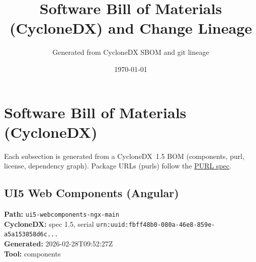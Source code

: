 \documentclass[11pt,a4paper]{article}
\title{\textbf{Software Bill of Materials (CycloneDX) and Change Lineage}}
\author{Generated from CycloneDX SBOM and git lineage}
\date{\today}
\begin{document}
\maketitle
\tableofcontents
\newpage
\section{Software Bill of Materials (CycloneDX)}
Each subsection is generated from a CycloneDX~1.5 BOM (components, purl, license, dependency graph). Package URLs (purls) follow the \href{https://github.com/package-url/purl-spec}{PURL spec}.

\subsection{UI5 Web Components (Angular)}
\textbf{Path:} \texttt{ui5-webcomponents-ngx-main}
\\ \textbf{CycloneDX:} spec 1.5, serial \texttt{urn:uuid:fbff48b0-080a-46e8-859e-a5a153858d6c...}
\\ \textbf{Generated:} 2026-02-28T09:52:27Z
\\ \textbf{Tool:} components
\end{document}

